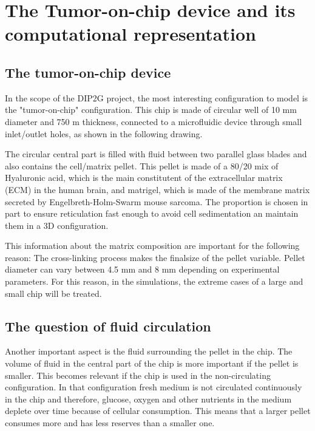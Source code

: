 \documentclass[11pt,a4paper]{article}
\begin{document}
\section{The Tumor-on-chip device and its computational representation}
\subsection{The tumor-on-chip device}
In the scope of the DIP2G project, the most interesting configuration to model is the "tumor-on-chip" configuration. This chip is made of circular well of 10 mm diameter and 750 \textmu m thickness, connected to a microfluidic device through small inlet/outlet holes, as shown in the following drawing.

\vspace{1cm}
\hspace{2cm}

The circular central part is filled with fluid between two parallel glass blades and also contains the cell/matrix pellet. This pellet is made of a 80/20 mix of Hyaluronic acid, which is the main constitutent of the extracellular matrix (ECM) in the human brain, and matrigel, which is made of the membrane matrix secreted by Engelbreth-Holm-Swarm mouse sarcoma. The proportion is chosen in part to ensure reticulation fast enough to avoid cell sedimentation an maintain them in a 3D configuration.

This information about the matrix composition are important for the following reason: The cross-linking process makes the finalsize of the pellet   variable. Pellet diameter can vary between 4.5 mm and 8 mm depending on experimental parameters. For this reason, in the simulations, the extreme cases of a large and small chip will be treated.

\subsection{The question of fluid circulation}
Another important aspect is the fluid surrounding the pellet in the chip. The volume of fluid in the central part of the chip is more important if the pellet is smaller. This becomes relevant if the chip is used in the non-circulating configuration. In that configuration fresh medium is not circulated continuously in the chip and therefore, glucose, oxygen and other nutrients in the medium deplete over time because of cellular consumption. This means that a larger pellet consumes more and has less reserves than a smaller one.
\end{document}
